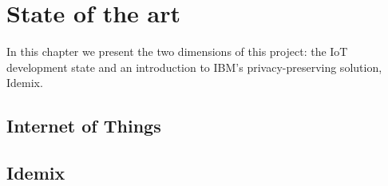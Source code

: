 \chapter{State of the art}\label{ch:stateoftheart}

In this chapter we present the two dimensions of this project: the \ac{IoT} development state and an introduction to IBM's privacy-preserving solution, Idemix.

\section{Internet of Things}



\section{Idemix}